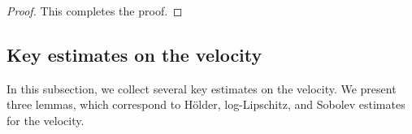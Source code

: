 \documentclass[10pt]{amsart}
\theoremstyle{definition}
\theoremstyle{remark}
\numberwithin{equation}{section}
\newcommand{\ud}{\mathrm{d}}
\newcommand{\rd}{\partial}
\newcommand{\0}{\emptyset}
\newcommand{\bbR}{\mathbb R}
\begin{document}
\begin{proof}
		This completes the proof.
	\end{proof}
	
	
	
	\subsection{Key estimates on the velocity }
	
	In this subsection, we collect several key estimates on the velocity. We present three lemmas, which correspond to H\"older, log-Lipschitz, and Sobolev estimates for the velocity. 
	
\end{document}
